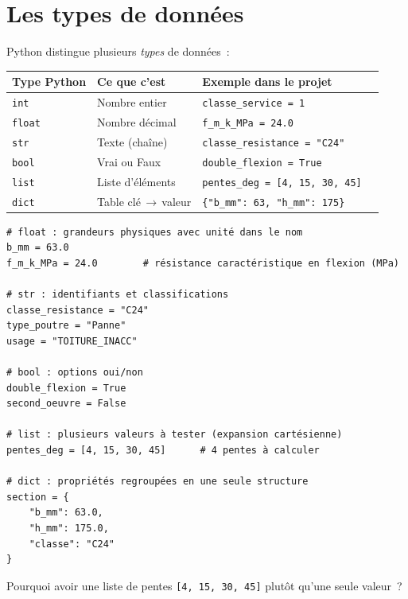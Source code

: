 \documentclass[12pt, a4paper, openany]{book}
\newcommand{\py}[1]{\texttt{#1}}
\begin{document}
\section{Les types de donn\'ees}

Python distingue plusieurs \emph{types} de donn\'ees~:

\begin{center}
\begin{tabular}{llll}
\toprule
\textbf{Type Python} & \textbf{Ce que c'est}    & \textbf{Exemple dans le projet}\\
\midrule
\py{int}             & Nombre entier             & \py{classe\_service = 1}\\
\py{float}           & Nombre d\'ecimal           & \py{f\_m\_k\_MPa = 24.0}\\
\py{str}             & Texte (cha\^ine)           & \py{classe\_resistance = "C24"}\\
\py{bool}            & Vrai ou Faux              & \py{double\_flexion = True}\\
\py{list}            & Liste d'\'el\'ements       & \py{pentes\_deg = [4, 15, 30, 45]}\\
\py{dict}            & Table cl\'e\,$\rightarrow$\,valeur   & \py{\{"b\_mm": 63, "h\_mm": 175\}}\\
\bottomrule
\end{tabular}
\end{center}

\begin{lstlisting}[style=python, caption={Types de données illustrés par des grandeurs charpente}]
# float : grandeurs physiques avec unité dans le nom
b_mm = 63.0
f_m_k_MPa = 24.0        # résistance caractéristique en flexion (MPa)

# str : identifiants et classifications
classe_resistance = "C24"
type_poutre = "Panne"
usage = "TOITURE_INACC"

# bool : options oui/non
double_flexion = True
second_oeuvre = False

# list : plusieurs valeurs à tester (expansion cartésienne)
pentes_deg = [4, 15, 30, 45]      # 4 pentes à calculer

# dict : propriétés regroupées en une seule structure
section = {
    "b_mm": 63.0,
    "h_mm": 175.0,
    "classe": "C24"
}
\end{lstlisting}

\begin{maitre}
Pourquoi avoir une liste de pentes \py{[4, 15, 30, 45]} plut\^ot qu'une
seule valeur~?
\end{maitre}
\end{document}

